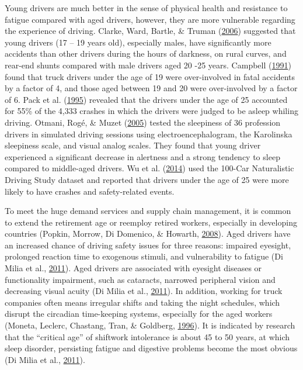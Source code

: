 \documentclass[12pt]{book}
\numberwithin{equation}{chapter}
\begin{document}
Young drivers are much better in the sense of physical health and resistance to fatigue compared with aged drivers, however, they are more vulnerable regarding the experience of driving. Clarke, Ward, Bartle, \& Truman (\protect\hyperlink{ref-clarke2006young}{2006}) suggested that young drivers (17 -- 19 years old), especially males, have significantly more accidents than other drivers during the hours of darkness, on rural curves, and rear-end shunts compared with male drivers aged 20 -25 years. Campbell (\protect\hyperlink{ref-campbell1991fatal}{1991}) found that truck drivers under the age of 19 were over-involved in fatal accidents by a factor of 4, and those aged between 19 and 20 were over-involved by a factor of 6. Pack et al. (\protect\hyperlink{ref-pack1995characteristics}{1995}) revealed that the drivers under the age of 25 accounted for 55\% of the 4,333 crashes in which the drivers were judged to be asleep whiling driving. Otmani, Rogé, \& Muzet (\protect\hyperlink{ref-otmani2005sleepiness}{2005}) tested the sleepiness of 36 profession drivers in simulated driving sessions using electroencephalogram, the Karolinska sleepiness scale, and visual analog scales. They found that young driver experienced a significant decrease in alertness and a strong tendency to sleep compared to middle-aged drivers. Wu et al. (\protect\hyperlink{ref-wu2014using}{2014}) used the 100-Car Naturalistic Driving Study dataset and reported that drivers under the age of 25 were more likely to have crashes and safety-related events.

To meet the huge demand services and supply chain management, it is common to extend the retirement age or reemploy retired workers, especially in developing countries (Popkin, Morrow, Di Domenico, \& Howarth, \protect\hyperlink{ref-popkin2008age}{2008}). Aged drivers have an increased chance of driving safety issues for three reasons: impaired eyesight, prolonged reaction time to exogenous stimuli, and vulnerability to fatigue (Di Milia et al., \protect\hyperlink{ref-di2011demographic}{2011}). Aged drivers are associated with eyesight diseases or functionality impairment, such as cataracts, narrowed peripheral vision and decreasing visual acuity (Di Milia et al., \protect\hyperlink{ref-di2011demographic}{2011}). In addition, working for truck companies often means irregular shifts and taking the night schedules, which disrupt the circadian time-keeping systems, especially for the aged workers (Moneta, Leclerc, Chastang, Tran, \& Goldberg, \protect\hyperlink{ref-moneta1996time}{1996}). It is indicated by research that the ``critical age'' of shiftwork intolerance is about 45 to 50 years, at which sleep disorder, persisting fatigue and digestive problems become the most obvious (Di Milia et al., \protect\hyperlink{ref-di2011demographic}{2011}).
\end{document}
